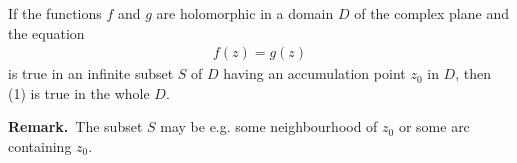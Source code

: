 \documentclass[12pt]{article}
\theoremstyle{definition}
\begin{document}
If the functions $f$ and $g$ are holomorphic in a domain $D$ of 
the complex plane and the equation
\begin{align}
f(z) = g(z)
\end{align}   
is true in an infinite subset $S$ of $D$ having an accumulation point $z_0$ in $D$, then (1) is true in the whole $D$.

\textbf{Remark.}\, The subset $S$ may be e.g. some neighbourhood of $z_0$ or some arc containing $z_0$.
\end{document}
